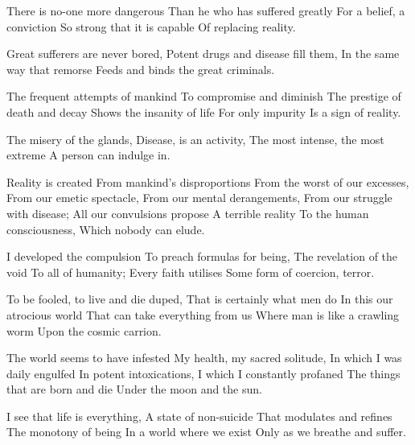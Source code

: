 \documentclass{article}
\newenvironment{stanza}{\begin{minipage}{10cm}\begin{internallinenumbers}\obeylines}{\end{internallinenumbers}\end{minipage}\vspace{\baselineskip}}
\begin{document}
\begin{stanza}
There is no-one more dangerous
Than he who has suffered greatly
For a belief, a conviction
So strong that it is capable
Of replacing reality.
\end{stanza}

\begin{stanza}
Great sufferers are never bored,
Potent drugs and disease fill them,
In the same way that remorse
Feeds and binds the great criminals.
\end{stanza}

\begin{stanza}
The frequent attempts of mankind
To compromise and diminish
The prestige of death and decay
Shows the insanity of life
For only impurity
Is a sign of reality.
\end{stanza}

\begin{stanza}
The misery of the glands,
Disease, is an activity,
The most intense, the most extreme
A person can indulge in.
\end{stanza}

\begin{stanza}
Reality is created
From mankind's disproportions
From the worst of our excesses,
From our emetic spectacle,
From our mental derangements,
From our struggle with disease;
All our convulsions propose
A terrible reality
To the human consciousness,
Which nobody can elude.
\end{stanza}

\begin{stanza}
I developed the compulsion
To preach formulas for being,
The revelation of the void
To all of humanity;
Every faith utilises
Some form of coercion, terror.
\end{stanza}

\begin{stanza}
To be fooled, to live and die duped,
That is certainly what men do
In this our atrocious world
That can take everything from us
Where man is like a crawling worm
Upon the cosmic carrion.
\end{stanza}

\begin{stanza}
The world seems to have infested
My health, my sacred solitude,
In which I was daily engulfed
In potent intoxications,
I which I constantly profaned
The things that are born and die
Under the moon and the sun.
\end{stanza}

\begin{stanza}
I see that life is everything,
A state of non-suicide
That modulates and refines
The monotony of being
In a world where we exist 
Only as we breathe and suffer.
\end{stanza}
\end{document}
